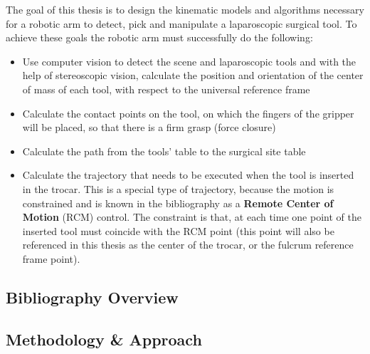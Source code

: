 The goal of this thesis is to design the kinematic models and algorithms necessary for a robotic arm to detect, pick and manipulate a laparoscopic surgical tool. To achieve these goals the robotic arm must 
successfully do the following:
\begin{itemize}
\item Use computer vision to detect the scene and laparoscopic tools and with the help of stereoscopic vision, calculate the position and orientation of the center of mass of each tool, with respect to the 
universal reference frame
\item Calculate the contact points on the tool, on which the fingers of the gripper will be placed, so that there is a firm grasp (force closure)
\item Calculate the path from the tools' table to the surgical site table
\item Calculate the trajectory that needs to be executed when the tool is inserted in the trocar. This is a special type of trajectory, because the motion is constrained and is known in the bibliography as
a \textbf{Remote Center of Motion} (RCM) control. The constraint is that, at each time one point of the inserted tool must coincide with the RCM point (this point will also be referenced in this thesis as the center of the 
trocar, or the fulcrum reference frame point).
\end{itemize}

\subsection{Bibliography Overview}

\subsection{Methodology \& Approach}